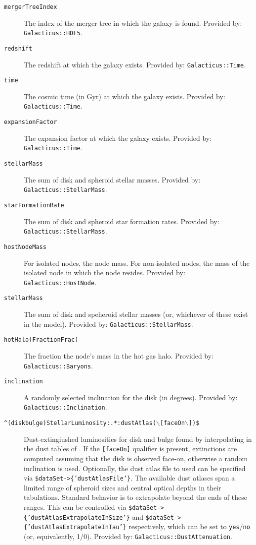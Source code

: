 \begin{description}
 \item[{\tt mergerTreeIndex}] The index of the merger tree in which the galaxy is found. Provided by: {\tt Galacticus::HDF5}.
 \item[{\tt redshift}] The redshift at which the galaxy exists. Provided by: {\tt Galacticus::Time}.
 \item[{\tt time}] The cosmic time (in Gyr) at which the galaxy exists. Provided by: {\tt Galacticus::Time}.
 \item[{\tt expansionFactor}] The expansion factor at which the galaxy exists. Provided by: {\tt Galacticus::Time}.
 \item[{\tt stellarMass}] The sum of disk and spheroid stellar masses. Provided by: {\tt Galacticus::StellarMass}.
 \item[{\tt starFormationRate}] The sum of disk and spheroid star formation rates. Provided by: {\tt Galacticus::StellarMass}.
 \item[{\tt hostNodeMass}] For isolated nodes, the node mass. For non-isolated nodes, the mass of the isolated node in which the node resides. Provided by: {\tt Galacticus::HostNode}.
 \item[{\tt stellarMass}] The sum of disk and speheroid stellar masses (or, whichever of these exist in the model). Provided by: {\tt Galacticus::StellarMass}.
 \item[{\tt hotHalo(Fraction\textbar Frac)}] The fraction the node's mass in the hot gas halo. Provided by: {\tt Galacticus::Baryons}.
 \item[{\tt inclination}] A randomly selected inclination for the disk (in degrees). Provided by: {\tt Galacticus::Inclination}.
 \item[{\tt \textasciicircum(disk\textbar bulge)StellarLuminosity:.*:dustAtlas($\backslash$[faceOn$\backslash$])\$}] Dust-extingiushed luminosities for disk and bulge found by interpolating in the dust tables of \cite{ferrara_atlas_1999}. If the {\tt [faceOn]} qualifier is present, extinctions are computed assuming that the disk is observed face-on, otherwise a random inclination is used. Optionally, the dust atlas file to used can be specified via {\tt \$dataSet-\textgreater\{'dustAtlasFile'\}}. The available dust atlases span a limited range of spheroid sizes and central optical depths in their tabulations. Standard behavior is to extrapolate beyond the ends of these ranges. This can be controlled via {\tt \$dataSet-\textgreater\{'dustAtlasExtrapolateInSize'\}} and {\tt \$dataSet-\textgreater\{'dustAtlasExtrapolateInTau'\}} respectively, which can be set to {\tt yes}/{\tt no} (or, equivalently, 1/0). Provided by: {\tt Galacticus::DustAttenuation}.

\end{description}
